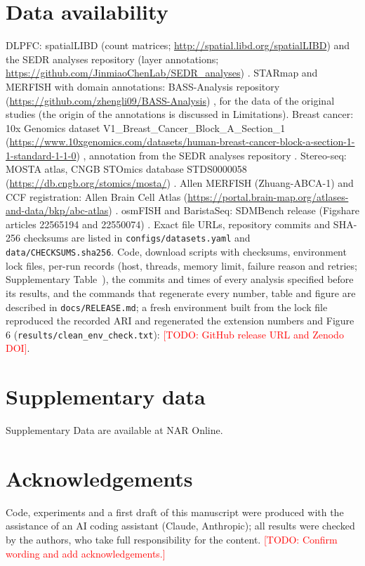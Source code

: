 \documentclass[unnumsec,webpdf,contemporary,large]{oup-authoring-template}
\newcommand{\todo}[1]{\textcolor{red}{[TODO: #1]}}
\begin{document}
\section*{Data availability}
DLPFC: spatialLIBD (count matrices; \url{http://spatial.libd.org/spatialLIBD}) and the SEDR analyses repository (layer
annotations; \url{https://github.com/JinmiaoChenLab/SEDR_analyses}) \citep{maynard2021dlpfc}. STARmap and MERFISH with domain
annotations: BASS-Analysis repository (\url{https://github.com/zhengli09/BASS-Analysis}) \citep{li2022bass}, for the data of the original
studies \citep{wang2018starmap,moffitt2018merfish} (the origin of the annotations is discussed in Limitations). Breast cancer: 10x Genomics dataset V1\_Breast\_Cancer\_Block\_A\_Section\_1
(\url{https://www.10xgenomics.com/datasets/human-breast-cancer-block-a-section-1-1-standard-1-1-0}) \citep{tenx2020brca}, annotation from the SEDR analyses repository \citep{xu2024sedr}.
Stereo-seq: MOSTA atlas, CNGB STOmics database STDS0000058 (\url{https://db.cngb.org/stomics/mosta/}) \citep{chen2022mosta}.
Allen MERFISH (Zhuang-ABCA-1) and CCF registration: Allen Brain Cell Atlas
(\url{https://portal.brain-map.org/atlases-and-data/bkp/abc-atlas}) \citep{zhang2023abca}. osmFISH and BaristaSeq: SDMBench release
(Figshare articles 22565194 and 22550074) \citep{yuan2024benchmark}. Exact file URLs, repository commits and SHA-256 checksums are listed in \texttt{configs/datasets.yaml} and
\texttt{data/CHECKSUMS.sha256}. Code, download scripts with checksums, environment lock files,
per-run records (host, threads, memory limit, failure reason and retries; Supplementary Table~\STfail), the commits and times of every analysis
specified before its results, and the commands that regenerate every number, table and figure are described in \texttt{docs/RELEASE.md}; a
fresh environment built from the lock file reproduced the recorded ARI and regenerated the extension numbers and Figure 6
(\texttt{results/clean\_env\_check.txt}): \todo{GitHub release URL and Zenodo DOI}.

\section*{Supplementary data}
Supplementary Data are available at NAR Online.

\section*{Acknowledgements}
Code, experiments and a first draft of this manuscript were produced with the assistance of an AI coding assistant (Claude,
Anthropic); all results were checked by the authors, who take full responsibility for the content. \todo{Confirm wording and add
acknowledgements.}
\end{document}
